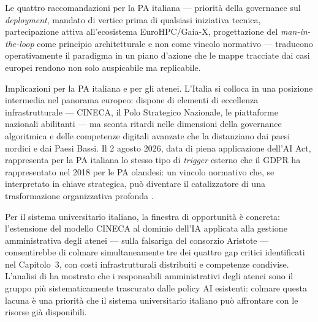 Le quattro raccomandazioni per la PA italiana --- priorità della governance sul
\textit{deployment}, mandato di vertice prima di qualsiasi iniziativa tecnica,
partecipazione attiva all'ecosistema EuroHPC/Gaia-X, progettazione del
\textit{man-in-the-loop} come principio architetturale e non come vincolo
normativo --- traducono operativamente il paradigma in un piano d'azione che le
mappe tracciate dai casi europei rendono non solo auspicabile ma replicabile.

\medskip

Implicazioni per la PA italiana e per gli atenei.
L'Italia si colloca in una posizione intermedia nel panorama europeo: dispone di
elementi di eccellenza infrastrutturale --- CINECA, il Polo Strategico Nazionale,
le piattaforme nazionali abilitanti --- ma sconta ritardi nelle dimensioni della
governance algoritmica e delle competenze digitali avanzate che la distanziano dai
paesi nordici e dai Paesi Bassi. Il 2 agosto 2026, data di piena
applicazione dell'AI Act, rappresenta per la PA italiana lo stesso tipo di
\textit{trigger} esterno che il GDPR ha rappresentato nel 2018 per le PA olandesi:
un vincolo normativo che, se interpretato in chiave strategica, può diventare il
catalizzatore di una trasformazione organizzativa profonda \parencite{Pavlidis2025EUAIAgency}.

Per il sistema universitario italiano, la finestra di opportunità è concreta:
l'estensione del modello CINECA al dominio dell'IA applicata alla gestione
amministrativa degli atenei --- sulla falsariga del consorzio Aristote --- consentirebbe
di colmare simultaneamente tre dei quattro gap critici identificati nel Capitolo~3,
con costi infrastrutturali distribuiti e competenze condivise. L'analisi di
\textcite{Stracke2025AIpoliciesHE} ha mostrato che i responsabili amministrativi
degli atenei sono il gruppo più sistematicamente trascurato dalle policy AI esistenti:
colmare questa lacuna è una priorità che il sistema universitario italiano può
affrontare con le risorse già disponibili.

\medskip

